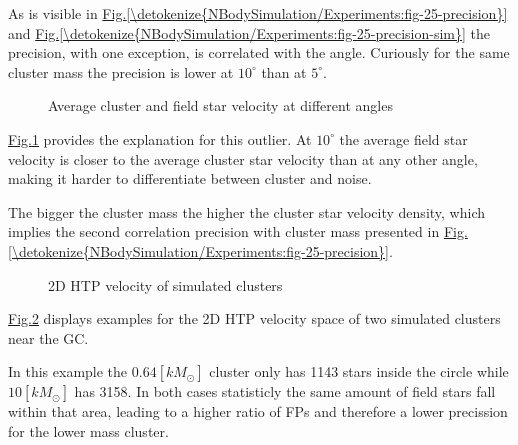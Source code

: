 \documentclass[letterpaper,10pt,english]{sphinxmanual}
\begin{document}
\sphinxAtStartPar
As is visible in \hyperref[\detokenize{NBodySimulation/Experiments:fig-25-precision}]{Fig.\@ \ref{\detokenize{NBodySimulation/Experiments:fig-25-precision}}} and \hyperref[\detokenize{NBodySimulation/Experiments:fig-25-precision-sim}]{Fig.\@ \ref{\detokenize{NBodySimulation/Experiments:fig-25-precision-sim}}} the precision, with one exception, is correlated with the angle.
Curiously for the same cluster mass the precision is lower at \(10^\circ\) than at \(5^\circ\).

\begin{figure}[htbp]
\centering
\capstart

\noindent{}
\caption{Average cluster and field star velocity at different angles}\label{\detokenize{NBodySimulation/Experiments:id7}}\label{\detokenize{NBodySimulation/Experiments:fig-25-avg-vel-640}}\end{figure}

\sphinxAtStartPar
\hyperref[\detokenize{NBodySimulation/Experiments:fig-25-avg-vel-640}]{Fig.\@ \ref{\detokenize{NBodySimulation/Experiments:fig-25-avg-vel-640}}} provides the explanation for this outlier.
At \(10^\circ\) the average field star velocity is closer to the average cluster star velocity than at any other angle, making it harder to differentiate between cluster and noise.

\sphinxAtStartPar
The bigger the cluster mass the higher the cluster star velocity density, which implies the second correlation \sphinxhyphen{} precision with cluster mass \sphinxhyphen{} presented in \hyperref[\detokenize{NBodySimulation/Experiments:fig-25-precision}]{Fig.\@ \ref{\detokenize{NBodySimulation/Experiments:fig-25-precision}}}.

\begin{figure}[htbp]
\centering
\capstart

\noindent{}
\caption{2D HTP velocity of simulated clusters}\label{\detokenize{NBodySimulation/Experiments:id8}}\label{\detokenize{NBodySimulation/Experiments:fig-25-vel-scatter}}\end{figure}

\sphinxAtStartPar
\hyperref[\detokenize{NBodySimulation/Experiments:fig-25-vel-scatter}]{Fig.\@ \ref{\detokenize{NBodySimulation/Experiments:fig-25-vel-scatter}}} displays examples for the 2D HTP velocity space of two simulated clusters near the GC.

\sphinxAtStartPar
In this example the \(0.64 [kM_{\odot}]\) cluster only has 1143 stars inside the circle while \(10 [kM_{\odot}]\) has 3158.
In both cases statisticly the same amount of field stars fall within that area, leading to a higher ratio of FPs and therefore a lower precission for the lower mass cluster.
\end{document}
